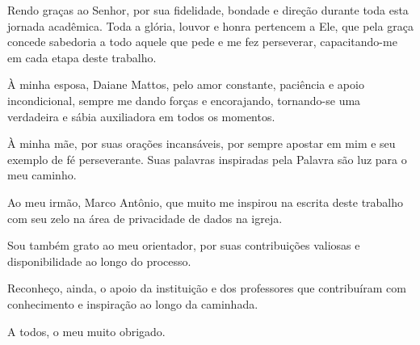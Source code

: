 \begin{agradecimentos}
Rendo graças ao Senhor, por sua fidelidade, bondade e direção durante toda esta jornada acadêmica. Toda a glória, louvor e honra pertencem a Ele, que pela graça concede sabedoria a todo aquele que pede e me fez perseverar, capacitando-me em cada etapa deste trabalho.

À minha esposa, Daiane Mattos, pelo amor constante, paciência e apoio incondicional, sempre me dando forças e encorajando, tornando-se uma verdadeira e sábia auxiliadora em todos os momentos.

À minha mãe, por suas orações incansáveis, por sempre apostar em mim e seu exemplo de fé perseverante. Suas palavras inspiradas pela Palavra são luz para o meu caminho.

Ao meu irmão, Marco Antônio, que muito me inspirou na escrita deste trabalho com seu zelo na área de privacidade de dados na igreja.

Sou também grato ao meu orientador, por suas contribuições valiosas e disponibilidade ao longo do processo.

Reconheço, ainda, o apoio da instituição e dos professores que contribuíram com conhecimento e inspiração ao longo da caminhada.

A todos, o meu muito obrigado.
\end{agradecimentos}